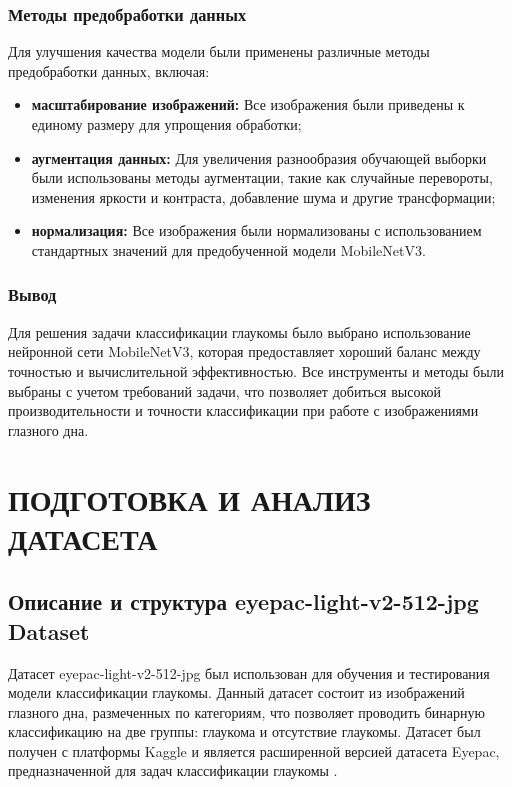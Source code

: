 {    \subsubsection*{Методы предобработки данных}

    Для улучшения качества модели были применены различные методы предобработки данных, включая:
    \begin{itemize}
        \item \textbf{масштабирование изображений:} Все изображения были приведены к единому размеру для упрощения обработки;
        \item \textbf{аугментация данных:} Для увеличения разнообразия обучающей выборки были использованы методы аугментации, такие как случайные перевороты, изменения яркости и контраста, добавление шума и другие трансформации;
        \item \textbf{нормализация:} Все изображения были нормализованы с использованием стандартных значений для предобученной модели MobileNetV3.
    \end{itemize}

    \subsubsection*{Вывод}

    Для решения задачи классификации глаукомы было выбрано использование нейронной сети MobileNetV3, которая предоставляет хороший баланс между точностью и вычислительной эффективностью. Все инструменты и методы были выбраны с учетом требований задачи, что позволяет добиться высокой производительности и точности классификации при работе с изображениями глазного дна.

\newpage


\section{ПОДГОТОВКА И АНАЛИЗ ДАТАСЕТА}

    \subsection{Описание и структура eyepac-light-v2-512-jpg Dataset}

    Датасет eyepac-light-v2-512-jpg был использован для обучения и тестирования модели классификации глаукомы. Данный датасет состоит из изображений глазного дна, размеченных по категориям, что позволяет проводить бинарную классификацию на две группы: глаукома и отсутствие глаукомы. Датасет был получен с платформы Kaggle и является расширенной версией датасета Eyepac, предназначенной для задач классификации глаукомы \cite{dataset}.

}
